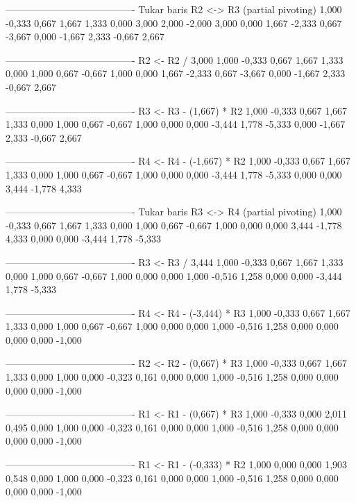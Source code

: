 \documentclass[12pt]{article}
\begin{document}
\begin{enumerate}
\begin{keluaran}
----------------------------------------
Tukar baris R2 <-> R3 (partial pivoting)
1,000   -0,333  0,667   1,667   1,333
0,000   3,000   2,000   -2,000  3,000
0,000   1,667   -2,333  0,667   -3,667
0,000   -1,667  2,333   -0,667  2,667

----------------------------------------
R2 <- R2 / 3,000
1,000   -0,333  0,667   1,667   1,333
0,000   1,000   0,667   -0,667  1,000
0,000   1,667   -2,333  0,667   -3,667
0,000   -1,667  2,333   -0,667  2,667

----------------------------------------
R3 <- R3 - (1,667) * R2
1,000   -0,333  0,667   1,667   1,333
0,000   1,000   0,667   -0,667  1,000
0,000   0,000   -3,444  1,778   -5,333
0,000   -1,667  2,333   -0,667  2,667

----------------------------------------
R4 <- R4 - (-1,667) * R2
1,000   -0,333  0,667   1,667   1,333
0,000   1,000   0,667   -0,667  1,000
0,000   0,000   -3,444  1,778   -5,333
0,000   0,000   3,444   -1,778  4,333

----------------------------------------
Tukar baris R3 <-> R4 (partial pivoting)
1,000   -0,333  0,667   1,667   1,333
0,000   1,000   0,667   -0,667  1,000
0,000   0,000   3,444   -1,778  4,333
0,000   0,000   -3,444  1,778   -5,333

----------------------------------------
R3 <- R3 / 3,444
1,000   -0,333  0,667   1,667   1,333
0,000   1,000   0,667   -0,667  1,000
0,000   0,000   1,000   -0,516  1,258
0,000   0,000   -3,444  1,778   -5,333

----------------------------------------
R4 <- R4 - (-3,444) * R3
1,000   -0,333  0,667   1,667   1,333
0,000   1,000   0,667   -0,667  1,000
0,000   0,000   1,000   -0,516  1,258
0,000   0,000   0,000   0,000   -1,000

----------------------------------------
R2 <- R2 - (0,667) * R3
1,000   -0,333  0,667   1,667   1,333
0,000   1,000   0,000   -0,323  0,161
0,000   0,000   1,000   -0,516  1,258
0,000   0,000   0,000   0,000   -1,000

----------------------------------------
R1 <- R1 - (0,667) * R3
1,000   -0,333  0,000   2,011   0,495
0,000   1,000   0,000   -0,323  0,161
0,000   0,000   1,000   -0,516  1,258
0,000   0,000   0,000   0,000   -1,000

----------------------------------------
R1 <- R1 - (-0,333) * R2
1,000   0,000   0,000   1,903   0,548
0,000   1,000   0,000   -0,323  0,161
0,000   0,000   1,000   -0,516  1,258
0,000   0,000   0,000   0,000   -1,000


\end{keluaran}
\end{enumerate}
\end{document}
